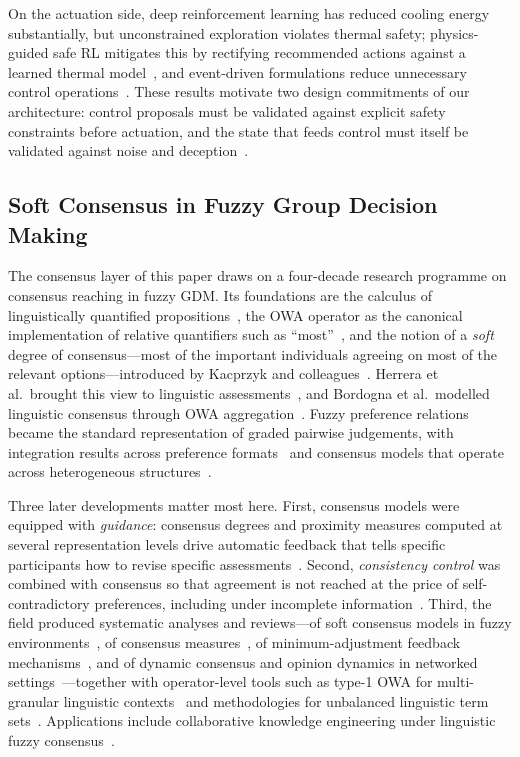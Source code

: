 \documentclass[preprint,11pt]{elsarticle}
\begin{document}
On the actuation side, deep reinforcement learning has reduced cooling
energy substantially, but unconstrained exploration violates thermal
safety; physics-guided safe RL mitigates this by rectifying recommended
actions against a learned thermal model~\cite{wang2024tcps}, and
event-driven formulations reduce unnecessary control
operations~\cite{ran2023event}. These results motivate two design
commitments of our architecture: control proposals must be validated
against explicit safety constraints before actuation, and the state
that feeds control must itself be validated against noise and
deception~\cite{padhan2022}.

\subsection{Soft Consensus in Fuzzy Group Decision Making}
\label{sec:related_gdm}

The consensus layer of this paper draws on a four-decade research
programme on consensus reaching in fuzzy GDM. Its foundations are the
calculus of linguistically quantified propositions~\cite{zadeh1983},
the OWA operator as the canonical implementation of relative
quantifiers such as ``most''~\cite{yager1988}, and the notion of a
\emph{soft} degree of consensus---most of the important individuals
agreeing on most of the relevant options---introduced by Kacprzyk and
colleagues~\cite{kacprzyk1986,kacprzyk1988,kacprzyk1992}. Herrera et
al.\ brought this view to linguistic assessments~\cite{herrera1996},
and Bordogna et al.\ modelled linguistic consensus through OWA
aggregation~\cite{bordogna1997}. Fuzzy preference relations became the
standard representation of graded pairwise judgements, with integration
results across preference formats~\cite{chiclana1998} and consensus
models that operate across heterogeneous
structures~\cite{herreraviedma2002}.

Three later developments matter most here. First, consensus models were
equipped with \emph{guidance}: consensus degrees and proximity measures
computed at several representation levels drive automatic feedback that
tells specific participants how to revise specific
assessments~\cite{herreraviedma2002,cabrerizo2009}. Second,
\emph{consistency control} was combined with consensus so that
agreement is not reached at the price of self-contradictory
preferences, including under incomplete
information~\cite{herreraviedma2007,cabrerizo2010kbs}. Third, the field
produced systematic analyses and reviews---of soft consensus models in
fuzzy environments~\cite{herreraviedma2014,cabrerizo2010soft,
cabrerizo2015}, of consensus measures~\cite{delmoral2018}, of
minimum-adjustment feedback mechanisms~\cite{zhang2020feedback}, and of
dynamic consensus and opinion dynamics in networked
settings~\cite{hassani2022}---together with operator-level tools such
as type-1 OWA for multi-granular linguistic
contexts~\cite{mata2014} and methodologies for unbalanced linguistic
term sets~\cite{herrera2008unbalanced}. Applications include
collaborative knowledge engineering under linguistic fuzzy
consensus~\cite{demaio2017}.
\end{document}
